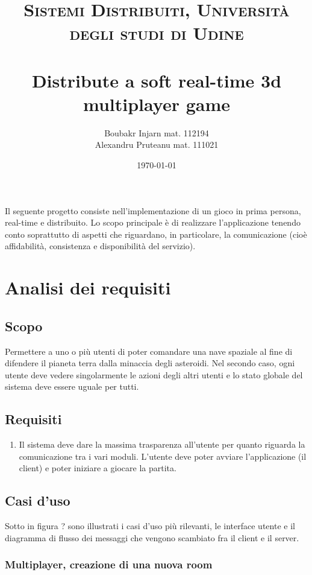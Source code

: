\documentclass[paper=a4, fontsize=11pt]{scrartcl} %
\title{	
\normalfont \normalsize 
\textsc{Sistemi Distribuiti, Università degli studi di Udine} \\ [25pt] %
\horrule{0.5pt} \\[0.4cm] %
\huge Distribute a soft real-time 3d multiplayer game%
\horrule{2pt} \\[0.5cm] %
}
\author{Boubakr Injarn mat. 112194\\Alexandru Pruteanu mat. 111021} %
\date{\normalsize\today} %
\numberwithin{equation}{section} %
\numberwithin{figure}{section} %
\numberwithin{table}{section} %
\begin{document}
\maketitle %
\newpage
\tableofcontents
\listoffigures
\newpage
\textbf{\abstractname}

Il seguente progetto consiste nell'implementazione di un gioco in prima persona, real-time e distribuito. Lo scopo principale è di realizzare l'applicazione tenendo conto soprattutto di aspetti che riguardano, in particolare, la comunicazione (cioè affidabilità, consistenza e disponibilità del servizio).



\section{Analisi dei requisiti}


\subsection{Scopo}
Permettere a uno o più utenti di poter comandare una nave spaziale al fine di difendere il pianeta terra dalla minaccia degli asteroidi. Nel secondo caso, ogni utente deve vedere singolarmente le azioni degli altri utenti e lo stato globale del sistema deve essere uguale per tutti.


\subsection{Requisiti}
\begin{enumerate}
\item Il sistema deve dare la massima trasparenza all'utente per quanto riguarda la comunicazione tra i vari moduli. L'utente deve poter avviare l'applicazione (il client) e poter iniziare a giocare la partita.
\end{enumerate}


\subsection{Casi d'uso}
Sotto in figura ? sono illustrati i casi d'uso più rilevanti, le interface utente e il
diagramma di flusso dei messaggi che vengono scambiato fra il client e il server.


\subsubsection{Multiplayer, creazione di una nuova room}
\end{document}
